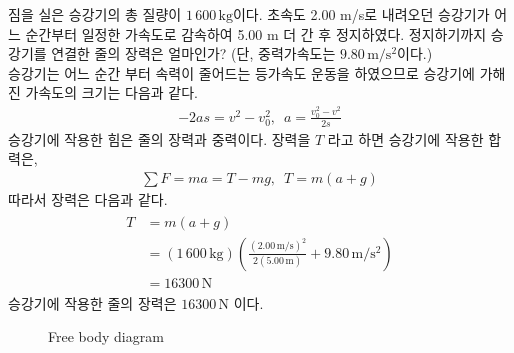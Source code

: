 \documentclass[floatfix,nofootinbib,superscriptaddress,fleqn,preprint]{revtex4}
\begin{document}
짐을 실은 승강기의 총 질량이 
$1\,600\,\mathrm{kg}$이다. 초속도 2.00 m/s로 내려오던 승강기가 어느
순간부터 일정한 가속도로 감속하여 5.00 m 더 간 후
정지하였다. 정지하기까지 승강기를 연결한 줄의 장력은 얼마인가? (단,
중력가속도는 $9.80\,\mathrm{m/s^2}$이다.)   \\

승강기는 어느 순간 부터 속력이 줄어드는 등가속도 운동을 하였으므로
 승강기에 가해진 가속도의 크기는 다음과 같다.
\begin{align}
  -2as = v^2-v_0^2,\,\,\, a = \frac{v_0^2-v^2}{2s}
\end{align}
승강기에 작용한 힘은 줄의 장력과 중력이다. 장력을 $T$ 라고 하면
 승강기에 작용한 합력은,
\begin{align}
  \sum F = ma = T-mg,\,\,\, T = m(a+g)
\end{align}
따라서 장력은 다음과 같다.
\begin{align}
  \begin{split}
    T  &= m(a+g)  \\ 
    &= (1\,600\,\mathrm{kg})\left(\frac{(2.00\,\mathrm{m/s})^2}
    {2(5.00\,\mathrm{m})}+9.80\,\mathrm{m/s^2}\right) \\
    &=16300\,\mathrm{N}
  \end{split}
\end{align}
승강기에 작용한 줄의 장력은 $16300\,\mathrm{N}$ 이다.


\begin{figure}[bh]
   \caption{Free body diagram}
\end{figure}

\vspace{2cm}
\end{document}
